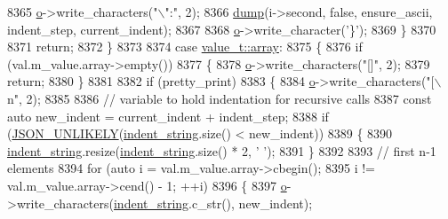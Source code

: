 \begin{DoxyCode}
8365                     \hyperlink{classnlohmann_1_1detail_1_1serializer_acf3c88660d3cbc65fc71c4d84f2a9f59}{o}->write\_characters(\textcolor{stringliteral}{"\(\backslash\)":"}, 2);
8366                     \hyperlink{classnlohmann_1_1detail_1_1serializer_a95460ebd1a535a543e5a0ec52e00f48b}{dump}(i->second, \textcolor{keyword}{false}, ensure\_ascii, indent\_step, current\_indent);
8367 
8368                     \hyperlink{classnlohmann_1_1detail_1_1serializer_acf3c88660d3cbc65fc71c4d84f2a9f59}{o}->write\_character(\textcolor{charliteral}{'\}'});
8369                 \}
8370 
8371                 \textcolor{keywordflow}{return};
8372             \}
8373 
8374             \textcolor{keywordflow}{case} \hyperlink{namespacenlohmann_1_1detail_a1ed8fc6239da25abcaf681d30ace4985af1f713c9e000f5d3f280adbd124df4f5}{value\_t::array}:
8375             \{
8376                 \textcolor{keywordflow}{if} (val.m\_value.array->empty())
8377                 \{
8378                     \hyperlink{classnlohmann_1_1detail_1_1serializer_acf3c88660d3cbc65fc71c4d84f2a9f59}{o}->write\_characters(\textcolor{stringliteral}{"[]"}, 2);
8379                     \textcolor{keywordflow}{return};
8380                 \}
8381 
8382                 \textcolor{keywordflow}{if} (pretty\_print)
8383                 \{
8384                     \hyperlink{classnlohmann_1_1detail_1_1serializer_acf3c88660d3cbc65fc71c4d84f2a9f59}{o}->write\_characters(\textcolor{stringliteral}{"[\(\backslash\)n"}, 2);
8385 
8386                     \textcolor{comment}{// variable to hold indentation for recursive calls}
8387                     \textcolor{keyword}{const} \textcolor{keyword}{auto} new\_indent = current\_indent + indent\_step;
8388                     \textcolor{keywordflow}{if} (\hyperlink{json_8hpp_ab77582407c64944e7db1ea95ab520253}{JSON\_UNLIKELY}(\hyperlink{classnlohmann_1_1detail_1_1serializer_ae9268a10d88a5526e32735a55a132fc6}{indent\_string}.size() < new\_indent))
8389                     \{
8390                         \hyperlink{classnlohmann_1_1detail_1_1serializer_ae9268a10d88a5526e32735a55a132fc6}{indent\_string}.resize(\hyperlink{classnlohmann_1_1detail_1_1serializer_ae9268a10d88a5526e32735a55a132fc6}{indent\_string}.size() * 2, \textcolor{charliteral}{' '});
8391                     \}
8392 
8393                     \textcolor{comment}{// first n-1 elements}
8394                     \textcolor{keywordflow}{for} (\textcolor{keyword}{auto} i = val.m\_value.array->cbegin();
8395                             i != val.m\_value.array->cend() - 1; ++i)
8396                     \{
8397                         \hyperlink{classnlohmann_1_1detail_1_1serializer_acf3c88660d3cbc65fc71c4d84f2a9f59}{o}->write\_characters(\hyperlink{classnlohmann_1_1detail_1_1serializer_ae9268a10d88a5526e32735a55a132fc6}{indent\_string}.c\_str(), new\_indent);

\end{DoxyCode}

